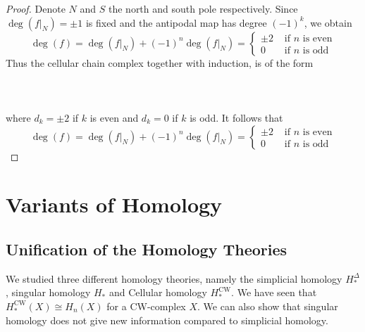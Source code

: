 \documentclass[a4paper]{article}
\begin{document}
\begin{thm}{}{}
\begin{proof}
Denote $N$ and $S$ the north and south pole respectively. Since $\deg(f|_N)=\pm 1$ is fixed and the antipodal map has degree $(-1)^k$, we obtain $$\deg(f)=\deg(f|_N)+(-1)^n\deg(f|_N)=\begin{cases}
\pm2 & \text{ if } n \text{ is even}\\
0 & \text{ if } n \text{ is odd}
\end{cases}$$ Thus the cellular chain complex together with induction, is of the form \\~\\
\\~\\
where $d_k=\pm2$ if $k$ is even and $d_k=0$ if $k$ is odd. It follows that $$\deg(f)=\deg(f|_N)+(-1)^n\deg(f|_N)=\begin{cases}
\pm2 & \text{ if } n \text{ is even}\\
0 & \text{ if } n \text{ is odd}
\end{cases}$$
\end{proof}
\end{thm}

\pagebreak
\section{Variants of Homology}
\subsection{Unification of the Homology Theories}
We studied three different homology theories, namely the simplicial homology $H_\ast^{\Delta}$, singular homology $H_\ast$ and Cellular homology $H_\ast^{\text{CW}}$. We have seen that $H_\ast^{\text{CW}}(X)\cong H_n(X)$ for a CW-complex $X$. We can also show that singular homology does not give new information compared to simplicial homology. 
\end{document}
